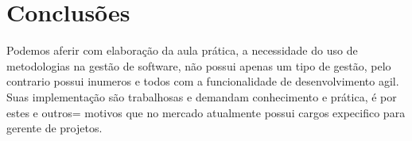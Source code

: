 






\section{Conclusões}

\par Podemos aferir com elaboração da aula prática, a necessidade do uso de metodologias na gestão de software, não possui apenas um tipo de gestão, pelo contrario possui inumeros e todos com a funcionalidade de desenvolvimento agil. Suas implementação são trabalhosas e demandam conhecimento e prática, é por estes e outros= motivos que no mercado atualmente possui cargos expecifico para gerente de projetos.



